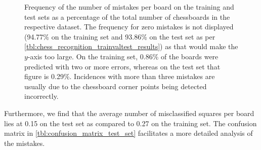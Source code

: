 \documentclass[../main.tex]{subfiles}
\begin{document}
\begin{figure}
{\begin{tikzpicture}
        \end{tikzpicture}
    }
    \caption[Frequency of the number of mistakes per board on the training and test sets.]{Frequency of the number of mistakes per board on the training and test sets as a percentage of the total number of chessboards in the respective dataset. The frequency for zero mistakes is not displayed (94.77\% on the training set and 93.86\% on the test set as per \cref{tbl:chess_recognition_trainvaltest_results}) as that would make the $y$-axis too large. On the training set, 0.86\% of the boards were predicted with two or more errors, whereas on the test set that figure is 0.29\%. Incidences with more than three mistakes are usually due to the chessboard corner points being detected incorrectly.}
    \label{fig:mistakes_frequency}
\end{figure}
Furthermore, we find that the average number of misclassified squares per board lies at 0.15 on the test set as compared to 0.27 on the training set.
The confusion matrix in \cref{tbl:confusion_matrix_test_set} facilitates a more detailed analysis of the mistakes.
\end{document}

